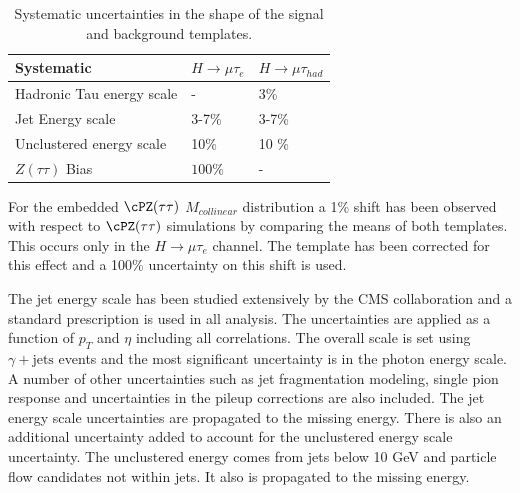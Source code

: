 \begin{table}[hbtp]
 \begin{center}
  \caption{Systematic uncertainties in the shape of the signal and background templates.}
  \label{tab:shape_systematics}
  \vspace{0.1in}
  \begin{tabular}{|l|l|l|} \hline
Systematic                                             &  $H \to \mu \tau_{e}$      &   $H \to \mu \tau_{had}$                                      \\ \hline\hline
Hadronic Tau energy scale                              &   -         &    3\%                                    \\    \hline
Jet Energy scale                                       &   3-7\%     &    3-7\%                                       \\    \hline
Unclustered energy scale                                &   10\%      &    10 \%                                  \\    \hline
$Z(\tau \tau)$ Bias                                 &   $100\%$ &     -                                          \\   \hline
  \end{tabular}
 \end{center}
\end{table}



For the embedded $\cPZ(\tau \tau)$ $M_{collinear}$ distribution a 1\% shift has been
observed with respect to $\cPZ(\tau \tau)$ simulations by comparing the means
of both templates.
This occurs only in the $H \rightarrow \mu \tau_{e}$ channel.
The template has been corrected for this effect  and a 100\% uncertainty on this shift is used.

The jet energy scale has been studied extensively by the CMS collaboration and a standard
prescription is used in all analysis.
The uncertainties are applied as a function of
$p_{T}$ and $\eta$ including all correlations. The overall scale is set using
$\gamma+\mathrm{jets}$ events and the most significant uncertainty is in the photon energy scale.
A number of other uncertainties such as jet fragmentation modeling, single pion response
and uncertainties in the pileup corrections are also included. The jet energy scale
uncertainties are propagated to the missing energy.  There is also an additional uncertainty added
to account for the unclustered energy scale uncertainty. The unclustered energy comes from jets below
10 GeV and particle flow candidates not within jets. It also is propagated to the missing energy.


